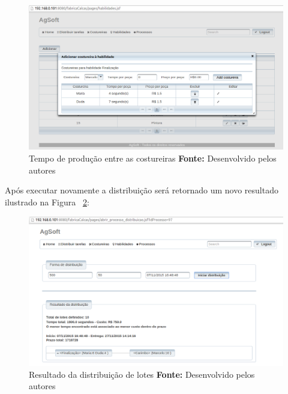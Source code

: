 \begin{figure}[h!]
	\centerline{\includegraphics[scale=0.4]{./imagens/alterando_tempo_costureira.png}}
	\caption[Tempo de produção entre as costureiras]
	{Tempo de produção entre as costureiras \textbf{Fonte:} Desenvolvido pelos autores}
	\label{fig:tempo_costureiras}
\end{figure}



\par Após executar novamente a distribuição será retornado um novo resultado
ilustrado na Figura ~\ref{fig:novo_resultado_distribuicao_teste1}:



\begin{figure}[h!]
	\centerline{\includegraphics[scale=0.4]{./imagens/novo_resultado_alterado_tempo_teste1.png}}
	\caption[Resultado da distribuição de lotes]
	{Resultado da distribuição de lotes \textbf{Fonte:} Desenvolvido pelos autores}
	\label{fig:novo_resultado_distribuicao_teste1}
\end{figure}

